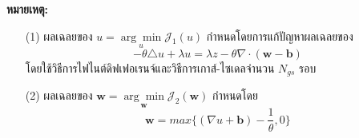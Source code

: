 
\vspace{0.5cm}
\textbf{หมายเหตุ:}
\begin{itemize}
	\item [(1)] ผลเฉลยของ $ u = \underset{u}{\arg\min} \mathcal{J}_1(u) $ กำหนดโดยการแก้ปัญหาผลเฉลยของ
	 $$ - \theta \triangle u + \lambda u = \lambda z - \theta \nabla \cdot (\boldsymbol{w}-\boldsymbol{b})$$ 
	 โดยใช้วิธีการไฟไนต์ดิฟเฟอเรนจ์และวิธีการเกาส์-ไซเดลจำนวน $N_{gs}$ รอบ
	\item [(2)] ผลเฉลยของ $ \boldsymbol{w} = \underset{\boldsymbol{w}}{\arg\min} \mathcal{J}_2(\boldsymbol{w}) $ กำหนดโดย $$\boldsymbol{w} = max\bigg\{(\nabla u + \boldsymbol{b}) - \frac{1}{\theta},0\bigg\}$$
\end{itemize}